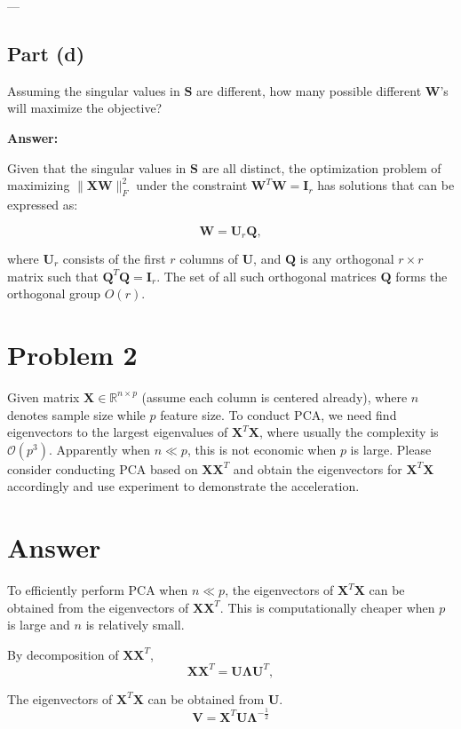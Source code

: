 \documentclass[11pt]{article}
\newcommand{\R}{\mathbb{R}}
\newcommand{\mtx}[1]{\mathbf{#1}}
\def \mU {\mtx{U}}
\def \mS {\mtx{S}}
\def \mW {\mtx{W}}
\def \mX {\mtx{X}}
\def \R {\mathbb{R}}
\begin{document}
---

\subsection*{Part (d)}
Assuming the singular values in $\mS$ are different, how many possible different $\bm{\mW}$'s will maximize the objective?

\textbf{Answer:}

Given that the singular values in \(\mathbf{S}\) are all distinct, the optimization problem of maximizing \(\|\mathbf{X} \mathbf{W}\|_F^2\) under the constraint \(\mathbf{W}^T \mathbf{W} = \mathbf{I}_r\) has solutions that can be expressed as:

\[
\mathbf{W} = \mathbf{U}_r \mathbf{Q},
\]

where \(\mathbf{U}_r\) consists of the first \(r\) columns of \(\mathbf{U}\), and \(\mathbf{Q}\) is any orthogonal \(r \times r\) matrix such that \(\mathbf{Q}^T \mathbf{Q} = \mathbf{I}_r\). The set of all such orthogonal matrices \(\mathbf{Q}\) forms the orthogonal group \(O(r)\).

\newpage

\section*{Problem 2}
	Given matrix $\mX\in\R^{n\times p}$ (assume each column is centered already), where $n$ denotes sample size while $p$ feature size. To conduct PCA, we need find eigenvectors to the  largest eigenvalues of $\mX^T\mX$, where usually the complexity is $\mathcal{O}(p^3)$. Apparently when $n\ll p$, this is not economic when $p$ is large. Please consider conducting PCA based on $\mX\mX^T$ and obtain the eigenvectors for $\mX^T\mX$ accordingly and use experiment to demonstrate the acceleration.

	\section*{Answer}

	To efficiently perform PCA when $n\ll p$, the eigenvectors of $\mX^T\mX$ can be obtained from the eigenvectors of $\mX\mX^T$. This is computationally cheaper when $p$ is large and $n$ is relatively small.
	
	By decomposition of $\mX\mX^T$,
	   \[
	   \mathbf{X}\mathbf{X}^T = \mathbf{U} \mathbf{\Lambda} \mathbf{U}^T,
	   \]
	
	The eigenvectors of $\mX^T\mX$ can be obtained from $\mU$.
		\[
		\mathbf{V} = \mathbf{X}^T \mathbf{U} \mathbf{\Lambda}^{-\frac{1}{2}}
		\]
	 
\end{document}
